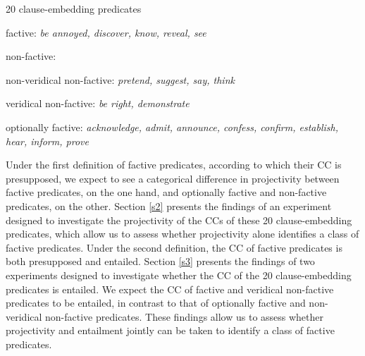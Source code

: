 \documentclass[11pt,fleqn]{article}
\newcommand{\6}{\mbox{$[\hspace*{-.6mm}[$}}
\newcommand{\9}{\mbox{$]\hspace*{-.6mm}]$}}
\begin{document}
\begin{exe}
\ex\label{pred} 20 clause-embedding predicates 

\begin{xlist}

\ex factive: {\em be annoyed, discover, know, reveal, see}

\ex non-factive:

\begin{xlist}

\ex non-veridical non-factive: {\em pretend, suggest, say, think}

\ex veridical non-factive: {\em be right, demonstrate}

\end{xlist}

\ex optionally factive: {\em acknowledge, admit, announce, confess, confirm, establish, hear, inform, prove}

\end{xlist}

\end{exe}

Under the first definition of factive predicates, according to which their CC is presupposed, we expect to see a categorical difference in projectivity between factive predicates, on the one hand, and optionally factive and non-factive predicates, on the other. Section \ref{s2} presents the findings of an experiment designed to investigate the projectivity of the CCs of these 20 clause-embedding predicates, which allow us to assess whether projectivity alone identifies a class of factive predicates. Under the second definition, the CC of factive predicates is both presupposed and entailed. Section \ref{s3} presents the findings of two experiments designed to investigate whether the CC of the 20 clause-embedding predicates is entailed. We expect the CC of factive and veridical non-factive predicates to be entailed, in contrast to that of optionally factive and non-veridical non-factive predicates. These findings allow us to assess whether projectivity and entailment jointly can be taken to identify a class of factive predicates.


\end{document}
